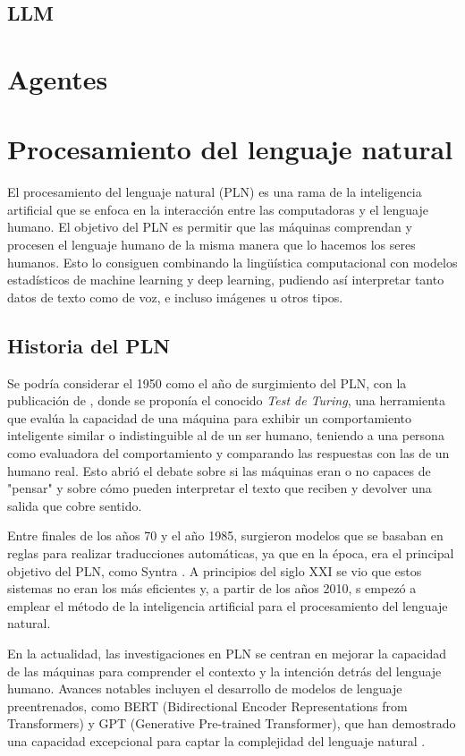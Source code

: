 \subsection{LLM}
\section{Agentes}

\section{Procesamiento del lenguaje natural}

El procesamiento del lenguaje natural (PLN) es una rama de la inteligencia artificial que se enfoca en la interacción entre las computadoras y el lenguaje humano. El objetivo del PLN es permitir que las máquinas comprendan y procesen el lenguaje humano de la misma manera que lo hacemos los seres humanos. Esto lo consiguen combinando la lingüística computacional con modelos estadísticos de machine learning y deep learning, pudiendo así interpretar tanto datos de texto como de voz, e incluso imágenes u otros tipos.

\subsection{Historia del PLN}

Se podría considerar el 1950 como el año de surgimiento del PLN, con la publicación de \cite{10.1093/mind/LIX.236.433}, donde se proponía el conocido \textit{Test de Turing}, una herramienta que evalúa la capacidad de una máquina para exhibir un comportamiento inteligente similar o indistinguible al de un ser humano, teniendo a una persona como evaluadora del comportamiento y comparando las respuestas con las de un humano real. Esto abrió el debate sobre si las máquinas eran o no capaces de "pensar" y sobre cómo pueden interpretar el texto que reciben y devolver una salida que cobre sentido.

Entre finales de los años 70 y el año 1985, surgieron modelos que se basaban en reglas para realizar traducciones automáticas, ya que en la época, era el principal objetivo del PLN, como Syntra \citep{Toma1970SYSTRANMT}. A principios del siglo XXI se vio que estos sistemas no eran los más eficientes y, a partir de los años 2010, s empezó a emplear el método de la inteligencia artificial para el procesamiento del lenguaje natural.

En la actualidad, las investigaciones en PLN se centran en mejorar la capacidad de las máquinas para comprender el contexto y la intención detrás del lenguaje humano. Avances notables incluyen el desarrollo de modelos de lenguaje preentrenados, como BERT (Bidirectional Encoder Representations from Transformers) y GPT (Generative Pre-trained Transformer), que han demostrado una capacidad excepcional para captar la complejidad del lenguaje natural \citep{devlin2019bert}.

